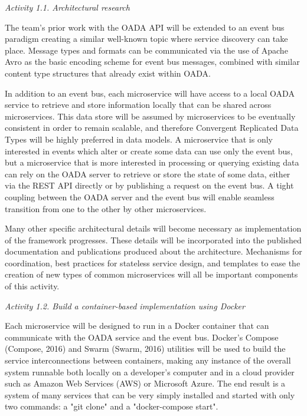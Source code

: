 \documentclass[11pt]{article}
\begin{document}
\noindent
{\em Activity 1.1. Architectural research}

The team's prior work with the OADA API will be extended to an event bus paradigm creating a similar well-known 
topic where service discovery can take place.  Message types and formats can be communicated via the use of 
Apache Avro \cite{Avro:16} as the basic encoding scheme for event bus messages, combined with similar 
content type structures that already exist within OADA.

In addition to an event bus, each microservice will have access to a local OADA service to retrieve and store 
information locally that can be shared across microservices.  This data store will be assumed by microservices to 
be eventually consistent in order to remain scalable, and therefore Convergent Replicated Data Types \cite{Shapiro:11} 
will be highly preferred in data models.  A microservice that is only interested in events which alter or create some data 
can use only the event bus, but a microservice that is more interested in processing or querying existing data can rely on the 
OADA server to retrieve or store the state of some data, either via the REST API directly or by publishing a request on the 
event bus.  A tight coupling between the OADA server and the event bus will enable seamless transition from 
one to the other by other microservices.

Many other specific architectural details will become necessary as implementation of the framework progresses.  
These details will be incorporated into the published documentation and publications produced about the architecture.  
Mechanisms for coordination, best practices for stateless service design, and templates to ease the creation of new 
types of common microservices will all be important components of this activity.

\noindent
{\em Activity 1.2. Build a container-based implementation using Docker}

Each microservice will be designed to run in a Docker container that can communicate with the OADA service 
and the event bus.  Docker's Compose (Compose, 2016) and Swarm (Swarm, 2016) utilities will be used to build the 
service interconnections between containers, making any instance of the overall system runnable both locally on a 
developer's computer and in a cloud provider such as Amazon Web Services (AWS) or Microsoft Azure.  The end 
result is a system of many services that can be very simply installed and started with only two commands: a "git clone" 
and a "docker-compose start".
\end{document}
